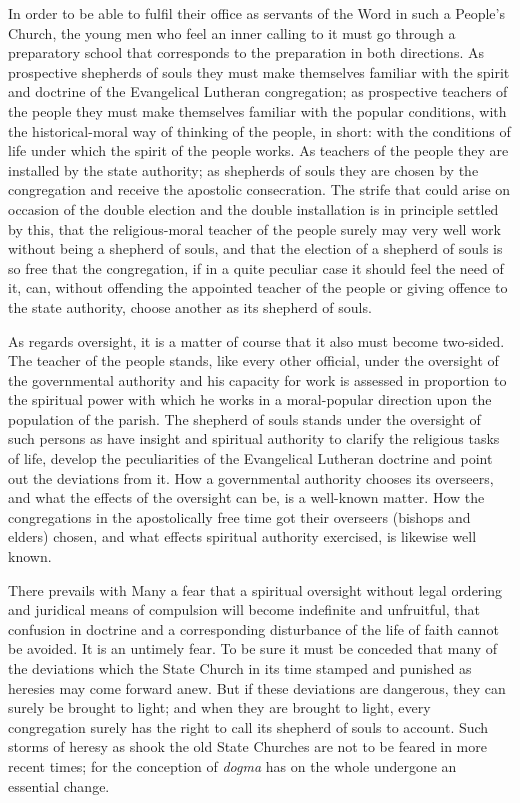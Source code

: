 \documentclass[12pt,a4paper,openany]{book}
\newcommand{\opage}[1]{\marginnote{\footnotesize\textit{[#1]}}}
\newcounter{lect}
\begin{document}
In order to be able to fulfil their office as servants of the Word in
such a People's Church, the young men who
feel an inner calling to it must go through a preparatory school that
corresponds to the preparation in both directions. As prospective
shepherds of souls they must make themselves familiar with the
spirit and doctrine of the Evangelical Lutheran congregation; as prospective
teachers of the people they must make themselves familiar with the
popular conditions, with the historical-moral way of thinking of the people,
in short: with the conditions of life under which the spirit of the people
works. As teachers of the people they are installed by the state authority;
as shepherds of souls they are chosen by the congregation
and receive the apostolic consecration. The strife
that could arise on occasion of the double election
and the double installation is in principle settled
by this, that the religious-moral teacher of the people surely may very
well work without being a shepherd of souls, and that the election
of a shepherd of souls is so free that the congregation, if
in a quite peculiar case it should feel the need of it,
can, without offending the appointed teacher of the people or
giving offence to the state authority, choose another
as its shepherd of souls.

As regards oversight, it is a matter of course that it
\setcounter{footnote}{0}%
\opage{117}also must become two-sided. The teacher of the people stands,
like every other official, under the oversight of
the governmental authority and his capacity for work is assessed
in proportion to the spiritual power with which he
works in a moral-popular direction upon the population of the parish.
The shepherd of souls stands under the oversight of such persons
as have insight and spiritual authority to clarify the
religious tasks of life, develop the peculiarities of
the Evangelical Lutheran doctrine and point out the deviations
from it. How a governmental authority chooses its
overseers, and what the effects of the oversight can be,
is a well-known matter. How the congregations in the
apostolically free time got their overseers (bishops
and elders) chosen, and what effects spiritual authority
exercised, is likewise well known.

There prevails with Many a fear that a spiritual
oversight without legal ordering and juridical means of compulsion
will become indefinite and unfruitful, that confusion
in doctrine and a corresponding disturbance of the life of faith
cannot be avoided. It is an untimely fear. To be sure
it must be conceded that many of the deviations which
the State Church in its time stamped and punished as heresies
may come forward anew. But if these deviations are
dangerous, they can surely be brought to light; and when they are brought to light,
every congregation surely has the right to call its
shepherd of souls to account. Such storms of heresy
as shook the old State Churches are not to be
feared in more recent times; for the conception of \emph{dogma}
has on the whole undergone an essential change.
\end{document}
